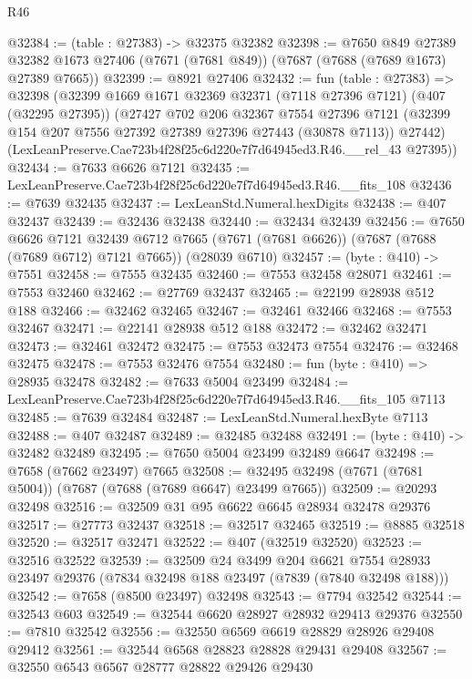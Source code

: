 \begin{lexlean}{R46}
\begin{coremodule}
@32384 := (table : @27383) -> @32375 @32382
@32398 := @7650
    @849
    @27389
    @32382
    @1673
    @27406
    (@7671 (@7681 @849))
    (@7687 (@7688 (@7689 @1673) @27389 @7665))
@32399 := @8921 @27406
@32432 := fun (table : @27383) =>
  @32398
    (@32399
      @1669
      @1671
      @32369
      @32371
      (@7118 @27396 @7121)
      (@407 (@32295 @27395))
      (@27427
        @702
        @206
        @32367
        @7554
        @27396
        @7121
        (@32399 @154 @207 @7556 @27392 @27389 @27396 @27443 (@30878 @7113))
        @27442)
      (LexLeanPreserve.Cae723b4f28f25c6d220e7f7d64945ed3.R46.__rel_43 @27395))
@32434 := @7633 @6626 @7121
@32435 := LexLeanPreserve.Cae723b4f28f25c6d220e7f7d64945ed3.R46.__fits_108
@32436 := @7639 @32435
@32437 := LexLeanStd.Numeral.hexDigits
@32438 := @407 @32437
@32439 := @32436 @32438
@32440 := @32434 @32439
@32456 := @7650
    @6626
    @7121
    @32439
    @6712
    @7665
    (@7671 (@7681 @6626))
    (@7687 (@7688 (@7689 @6712) @7121 @7665))
    (@28039 @6710)
@32457 := (byte : @410) -> @7551
@32458 := @7555 @32435
@32460 := @7553 @32458 @28071
@32461 := @7553 @32460
@32462 := @27769 @32437
@32465 := @22199 @28938 @512 @188
@32466 := @32462 @32465
@32467 := @32461 @32466
@32468 := @7553 @32467
@32471 := @22141 @28938 @512 @188
@32472 := @32462 @32471
@32473 := @32461 @32472
@32475 := @7553 @32473 @7554
@32476 := @32468 @32475
@32478 := @7553 @32476 @7554
@32480 := fun (byte : @410) => @28935 @32478
@32482 := @7633 @5004 @23499
@32484 := LexLeanPreserve.Cae723b4f28f25c6d220e7f7d64945ed3.R46.__fits_105 @7113
@32485 := @7639 @32484
@32487 := LexLeanStd.Numeral.hexByte @7113
@32488 := @407 @32487
@32489 := @32485 @32488
@32491 := (byte : @410) -> @32482 @32489
@32495 := @7650 @5004 @23499 @32489 @6647
@32498 := @7658 (@7662 @23497) @7665
@32508 := @32495 @32498 (@7671 (@7681 @5004)) (@7687 (@7688 (@7689 @6647) @23499 @7665))
@32509 := @20293 @32498
@32516 := @32509 @31 @95 @6622 @6645 @28934 @32478 @29376
@32517 := @27773 @32437
@32518 := @32517 @32465
@32519 := @8885 @32518
@32520 := @32517 @32471
@32522 := @407 (@32519 @32520)
@32523 := @32516 @32522
@32539 := @32509
    @24
    @3499
    @204
    @6621
    @7554
    @28933
    @23497
    @29376
    (@7834 @32498 @188 @23497 (@7839 (@7840 @32498 @188)))
@32542 := @7658 (@8500 @23497) @32498
@32543 := @7794 @32542
@32544 := @32543 @603
@32549 := @32544 @6620 @28927 @28932 @29413 @29376
@32550 := @7810 @32542
@32556 := @32550 @6569 @6619 @28829 @28926 @29408 @29412
@32561 := @32544 @6568 @28823 @28828 @29431 @29408
@32567 := @32550 @6543 @6567 @28777 @28822 @29426 @29430

\end{coremodule}
\end{lexlean}
